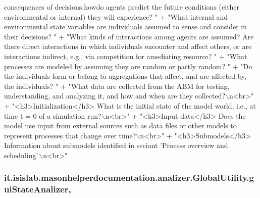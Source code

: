 \begin{DoxyCode}
{       consequences of decisions,howdo agents predict the future conditions (either environmental or internal)
       they will experience? "}
                                             +                            \textcolor{stringliteral}{"What internal and environmental
       state variables are individuals assumed to sense and consider in their decisions? "}
                                             +                            \textcolor{stringliteral}{"What kinds of interactions among
       agents are assumed? Are there direct interactions in which individuals encounter and affect others, or are
       interactions indirect, e.g., via competition for amediating resource? "}
                                             +                            \textcolor{stringliteral}{"What processes are modeled by
       assuming they are random or partly random? "}
                                             +                            \textcolor{stringliteral}{"Do the individuals form or
       belong to aggregations that affect, and are affected by, the individuals? "}
                                             +                            \textcolor{stringliteral}{"What data are collected from the
       ABM for testing, understanding, and analyzing it, and how and when are they collected?\(\backslash\)n<br>"}
                                             + \textcolor{stringliteral}{"<h3>Initialization</h3> What is the initial state of the
       model world, i.e., at time t = 0 of a simulation run?\(\backslash\)n<br>"}
                                             + \textcolor{stringliteral}{"<h3>Input data</h3> Does the model use input from external
       sources such as data files or other models to represent processes that change over time?\(\backslash\)n<br>"}
                                             + \textcolor{stringliteral}{"<h3>Submodels</h3> Information about submodels identified
       in seciont 'Process overview and scheduling'.\(\backslash\)n<br>"}
\end{DoxyCode}
\hypertarget{classit_1_1isislab_1_1masonhelperdocumentation_1_1analizer_1_1_global_utility_a0104f618583fd4e003dcc2b40ba5b8e8}{
\subsubsection[{gui\-State\-Analizer}]{ it.\-isislab.\-masonhelperdocumentation.\-analizer.\-Global\-Utility.\-gui\-State\-Analizer\hspace{0.3cm}{\ttfamily [static]}, {\ttfamily [private]}}}\label{classit_1_1isislab_1_1masonhelperdocumentation_1_1analizer_1_1_global_utility_a0104f618583fd4e003dcc2b40ba5b8e8}
